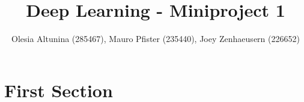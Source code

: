 \documentclass[10pt,conference,compsocconf]{IEEEtran}
\begin{document}
\title{Deep Learning - Miniproject 1}

\author{
  Olesia Altunina (285467), Mauro Pfister (235440), Joey Zenhaeusern (226652)
}

\maketitle

\begin{abstract}

\end{abstract}

\section{First Section}



\end{document}
